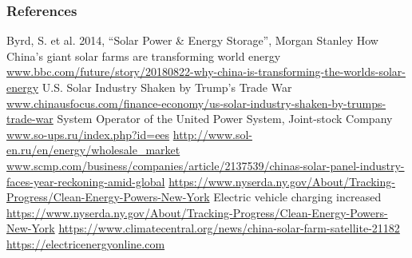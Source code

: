 \documentclass[14pt]{beamer}
\begin{document}
\begin{thebibliography}{7}
\begin{frame}
\frametitle{\small References}
	\tiny{ 
 Byrd, S. et al. 2014, “Solar Power \& Energy Storage”, Morgan Stanley 
	 How China's giant solar farms are transforming world energy \url{www.bbc.com/future/story/20180822-why-china-is-transforming-the-worlds-solar-energy}
		U.S. Solar Industry Shaken by Trump’s Trade War \url{www.chinausfocus.com/finance-economy/us-solar-industry-shaken-by-trumps-trade-war}
	 System Operator of the United Power System, Joint-stock Company  \url{www.so-ups.ru/index.php?id=ees}	
		\url{http://www.sol-en.ru/en/energy/wholesale_market}
	 \url{www.scmp.com/business/companies/article/2137539/chinas-solar-panel-industry-faces-year-reckoning-amid-global}
	 \url{https://www.nyserda.ny.gov/About/Tracking-Progress/Clean-Energy-Powers-New-York}
	 Electric vehicle charging increased  \url{https://www.nyserda.ny.gov/About/Tracking-Progress/Clean-Energy-Powers-New-York}
	 \url{https://www.climatecentral.org/news/china-solar-farm-satellite-21182}
	 \url{https://electricenergyonline.com}
		}
\end{frame}
\begin{frame}
	\tiny{
%


}
\end{frame}
\end{thebibliography}
\end{document}
